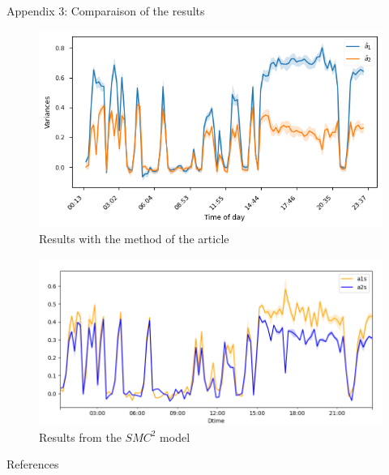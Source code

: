 \documentclass[dvipsnames, handout]{beamer}
\begin{document}
\begin{frame}{Appendix 3: Comparaison of the results}
\begin{figure}[h!]
    \centering
    \includegraphics[scale=0.37]{a1_a2_var_0.5.png}
        \caption{Results with the method of the article}
      \label{fig:paper_results_annexes}
\end{figure}

\begin{figure}[h!]
    \centering
    \includegraphics[scale=0.18]{Screenshot from 2023-01-05 23-14-51.png}
        \caption{Results from the $SMC^2$ model}
      \label{fig:smc2_results_annexe}
\end{figure}

\end{frame}
\begin{frame}{References}

\nocite{*}


\end{frame}
\end{document}
